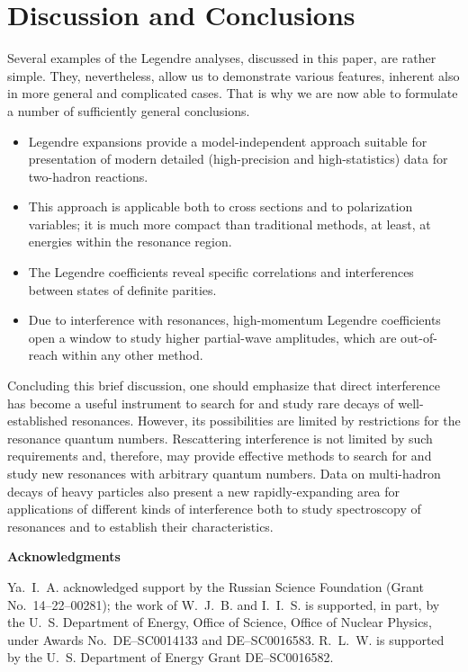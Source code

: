 \documentclass[prc,reprint,onecolumn,amsmath,amssymb,superscriptaddress]{revtex4-1}
\begin{document}
\section{Discussion and Conclusions}
\label{sec:conc}

Several examples of the Legendre analyses, discussed in this paper, 
are rather simple.  They, nevertheless, allow us to demonstrate various 
features, inherent also in more general and complicated cases. That is 
why we are now able to formulate a number of sufficiently general 
conclusions.

\begin{itemize}
\item Legendre expansions provide a model-independent approach suitable for 
	presentation of modern detailed (high-precision and high-statistics) 
	data for two-hadron reactions.
\item This approach is applicable both to cross sections and to polarization 
	variables; it is much more compact than traditional methods, at 
	least, at energies within the resonance region.
\item The Legendre coefficients reveal specific correlations and 
	interferences between states of definite parities.
\item Due to interference with resonances, high-momentum Legendre 
	coefficients open a window to study higher partial-wave amplitudes, 
	which are out-of-reach within any other method.
\end{itemize}

Concluding this brief discussion, one should emphasize that direct 
interference has become a useful instrument to search for and study 
rare decays of well-established resonances. However, its possibilities are 
limited by restrictions for the resonance quantum numbers. Rescattering 
interference is not limited by such requirements and, therefore, may 
provide effective methods to search for and study new resonances with arbitrary 
quantum numbers. Data on multi-hadron decays of heavy particles also 
present a new rapidly-expanding area for applications of different kinds 
of interference both to study spectroscopy of resonances and to establish 
their characteristics.

\vspace{5mm}
\centerline{\bf Acknowledgments}
\vspace{2mm}

Ya.~I.~A. acknowledged support by the Russian Science Foundation
(Grant No.~14--22--00281); the work of W.~J.~B. and I.~I.~S. is supported,
in part, by the U.~S. Department of Energy, Office of Science, Office
of Nuclear Physics, under Awards No.~DE--SC0014133 and DE--SC0016583.
R.~L.~W. is supported by the U.~S. Department of Energy Grant DE--SC0016582.
\end{document}
